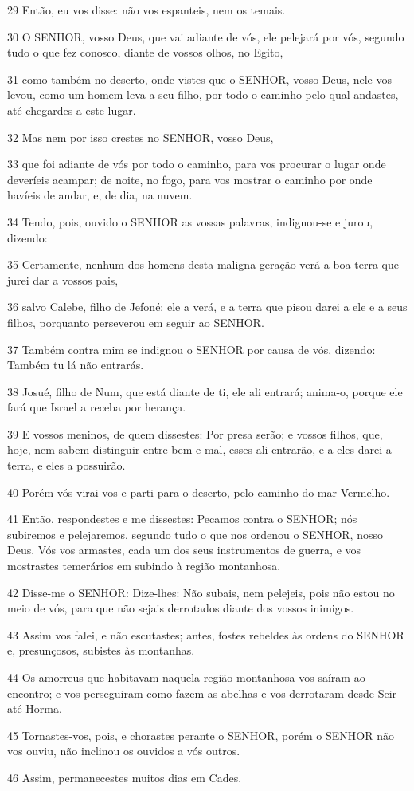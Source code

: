 \par 29 Então, eu vos disse: não vos espanteis, nem os temais.
\par 30 O SENHOR, vosso Deus, que vai adiante de vós, ele pelejará por vós, segundo tudo o que fez conosco, diante de vossos olhos, no Egito,
\par 31 como também no deserto, onde vistes que o SENHOR, vosso Deus, nele vos levou, como um homem leva a seu filho, por todo o caminho pelo qual andastes, até chegardes a este lugar.
\par 32 Mas nem por isso crestes no SENHOR, vosso Deus,
\par 33 que foi adiante de vós por todo o caminho, para vos procurar o lugar onde deveríeis acampar; de noite, no fogo, para vos mostrar o caminho por onde havíeis de andar, e, de dia, na nuvem.
\par 34 Tendo, pois, ouvido o SENHOR as vossas palavras, indignou-se e jurou, dizendo:
\par 35 Certamente, nenhum dos homens desta maligna geração verá a boa terra que jurei dar a vossos pais,
\par 36 salvo Calebe, filho de Jefoné; ele a verá, e a terra que pisou darei a ele e a seus filhos, porquanto perseverou em seguir ao SENHOR.
\par 37 Também contra mim se indignou o SENHOR por causa de vós, dizendo: Também tu lá não entrarás.
\par 38 Josué, filho de Num, que está diante de ti, ele ali entrará; anima-o, porque ele fará que Israel a receba por herança.
\par 39 E vossos meninos, de quem dissestes: Por presa serão; e vossos filhos, que, hoje, nem sabem distinguir entre bem e mal, esses ali entrarão, e a eles darei a terra, e eles a possuirão.
\par 40 Porém vós virai-vos e parti para o deserto, pelo caminho do mar Vermelho.
\par 41 Então, respondestes e me dissestes: Pecamos contra o SENHOR; nós subiremos e pelejaremos, segundo tudo o que nos ordenou o SENHOR, nosso Deus. Vós vos armastes, cada um dos seus instrumentos de guerra, e vos mostrastes temerários em subindo à região montanhosa.
\par 42 Disse-me o SENHOR: Dize-lhes: Não subais, nem pelejeis, pois não estou no meio de vós, para que não sejais derrotados diante dos vossos inimigos.
\par 43 Assim vos falei, e não escutastes; antes, fostes rebeldes às ordens do SENHOR e, presunçosos, subistes às montanhas.
\par 44 Os amorreus que habitavam naquela região montanhosa vos saíram ao encontro; e vos perseguiram como fazem as abelhas e vos derrotaram desde Seir até Horma.
\par 45 Tornastes-vos, pois, e chorastes perante o SENHOR, porém o SENHOR não vos ouviu, não inclinou os ouvidos a vós outros.
\par 46 Assim, permanecestes muitos dias em Cades.


